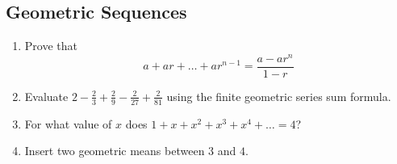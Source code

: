 \documentclass[twocolumn]{article}
\begin{document}
    \subsection*{Geometric Sequences}
    \begin{enumerate}[resume]
        \item Prove that
        \[a + ar + \dots + ar^{n - 1} = \frac{a - ar^n}{1 - r}\]
        \vspace{3cm}
        \item Evaluate $2 - \frac{2}{3} + \frac{2}{9} - \frac{2}{27} +
        \frac{2}{81}$ using the finite geometric series sum formula.
        \vspace{3cm}
        \item For what value of $x$ does $1 + x + x^2 + x^3 + x^4 + \dots =
        4$?
        \vspace{3cm}
        \item Insert two geometric means between $3$ and $4$.
        \vspace{3cm}
    \end{enumerate}
\end{document}
